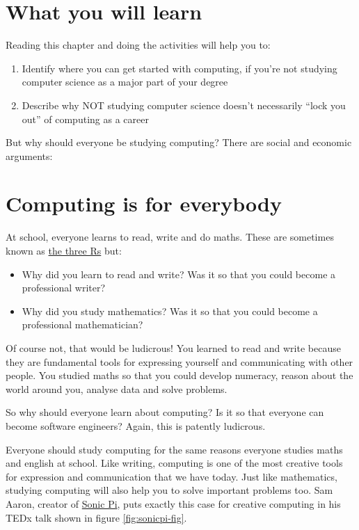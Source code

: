 \documentclass[
]{book}
\providecommand{\tightlist}{%
  \setlength{\itemsep}{0pt}\setlength{\parskip}{0pt}}
\begin{document}
\hypertarget{ilo6}{%
\section{What you will learn}\label{ilo6}}

Reading this chapter and doing the activities will help you to:

\begin{enumerate}
\def\labelenumi{\arabic{enumi}.}
\tightlist
\item
  Identify where you can get started with computing, if you're not studying computer science as a major part of your degree
\item
  Describe why NOT studying computer science doesn't necessarily ``lock you out'' of computing as a career
\end{enumerate}

But why should everyone be studying computing? There are social and economic arguments:

\hypertarget{creative}{%
\section{Computing is for everybody}\label{creative}}

At school, everyone learns to read, write and do maths. These are sometimes known as \href{https://en.wikipedia.org/wiki/The_three_Rs}{the three Rs} but:

\begin{itemize}
\tightlist
\item
  Why did you learn to read and write? Was it so that you could become a professional writer?
\item
  Why did you study mathematics? Was it so that you could become a professional mathematician?
\end{itemize}

Of course not, that would be ludicrous! You learned to read and write because they are fundamental tools for expressing yourself and communicating with other people. You studied maths so that you could develop numeracy, reason about the world around you, analyse data and solve problems.

So why should everyone learn about computing? Is it so that everyone can become software engineers? Again, this is patently ludicrous.

Everyone should study computing for the same reasons everyone studies maths and english at school. Like writing, computing is one of the most creative tools for expression and communication that we have today. Just like mathematics, studying computing will also help you to solve important problems too. Sam Aaron, creator of \href{https://en.wikipedia.org/wiki/Sonic_Pi}{Sonic Pi}, puts exactly this case for creative computing in his TEDx talk \citep{youtube-sonicpi} shown in figure \ref{fig:sonicpi-fig}.
\end{document}
